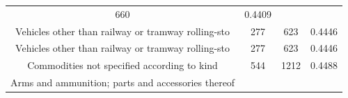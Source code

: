 \documentclass[10pt,]{article}
\begin{document}
\begin{longtable}[]{@{}cccc@{}}
\begin{minipage}[t]{0.20\columnwidth}
660\strut
\end{minipage} & \begin{minipage}[t]{0.09\columnwidth}\centering\strut
0.4409\strut
\end{minipage}\tabularnewline
\begin{minipage}[t]{0.38\columnwidth}\centering\strut
Vehicles other than railway or tramway rolling-sto\strut
\end{minipage} & \begin{minipage}[t]{0.21\columnwidth}\centering\strut
277\strut
\end{minipage} & \begin{minipage}[t]{0.20\columnwidth}\centering\strut
623\strut
\end{minipage} & \begin{minipage}[t]{0.09\columnwidth}\centering\strut
0.4446\strut
\end{minipage}\tabularnewline
\begin{minipage}[t]{0.38\columnwidth}\centering\strut
Vehicles other than railway or tramway rolling-sto\strut
\end{minipage} & \begin{minipage}[t]{0.21\columnwidth}\centering\strut
277\strut
\end{minipage} & \begin{minipage}[t]{0.20\columnwidth}\centering\strut
623\strut
\end{minipage} & \begin{minipage}[t]{0.09\columnwidth}\centering\strut
0.4446\strut
\end{minipage}\tabularnewline
\begin{minipage}[t]{0.38\columnwidth}\centering\strut
Commodities not specified according to kind\strut
\end{minipage} & \begin{minipage}[t]{0.21\columnwidth}\centering\strut
544\strut
\end{minipage} & \begin{minipage}[t]{0.20\columnwidth}\centering\strut
1212\strut
\end{minipage} & \begin{minipage}[t]{0.09\columnwidth}\centering\strut
0.4488\strut
\end{minipage}\tabularnewline
\begin{minipage}[t]{0.38\columnwidth}\centering\strut
Arms and ammunition; parts and accessories thereof\strut
\end{minipage} & \begin{minipage}[t]{0.21\columnwidth}\centering\strut

\end{minipage}
\end{longtable}
\end{document}
